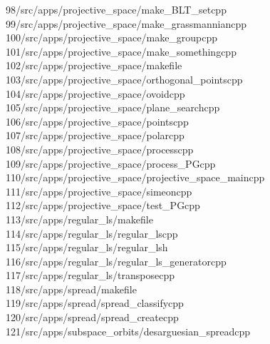 \begin{tabbing}
98\>/src/apps/projective\_space/make\_BLT\_setcpp\\[0pt]
99\>/src/apps/projective\_space/make\_grassmanniancpp\\[0pt]
100\>/src/apps/projective\_space/make\_groupcpp\\[0pt]
101\>/src/apps/projective\_space/make\_somethingcpp\\[0pt]
102\>/src/apps/projective\_space/makefile\\[0pt]
103\>/src/apps/projective\_space/orthogonal\_pointscpp\\[0pt]
104\>/src/apps/projective\_space/ovoidcpp\\[0pt]
105\>/src/apps/projective\_space/plane\_searchcpp\\[0pt]
106\>/src/apps/projective\_space/pointscpp\\[0pt]
107\>/src/apps/projective\_space/polarcpp\\[0pt]
108\>/src/apps/projective\_space/processcpp\\[0pt]
109\>/src/apps/projective\_space/process\_PGcpp\\[0pt]
110\>/src/apps/projective\_space/projective\_space\_maincpp\\[0pt]
111\>/src/apps/projective\_space/simeoncpp\\[0pt]
112\>/src/apps/projective\_space/test\_PGcpp\\[0pt]
113\>/src/apps/regular\_ls/makefile\\[0pt]
114\>/src/apps/regular\_ls/regular\_lscpp\\[0pt]
115\>/src/apps/regular\_ls/regular\_lsh\\[0pt]
116\>/src/apps/regular\_ls/regular\_ls\_generatorcpp\\[0pt]
117\>/src/apps/regular\_ls/transposecpp\\[0pt]
118\>/src/apps/spread/makefile\\[0pt]
119\>/src/apps/spread/spread\_classifycpp\\[0pt]
120\>/src/apps/spread/spread\_createcpp\\[0pt]
121\>/src/apps/subspace\_orbits/desarguesian\_spreadcpp\\[0pt]

\end{tabbing}
